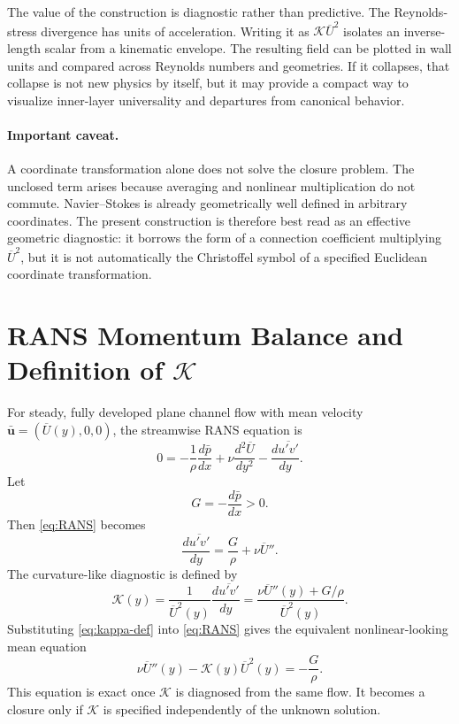 \documentclass[11pt]{article}
\newcommand{\Ut}{\overline{U}}
\newcommand{\uv}{\overline{u'v'}}
\newcommand{\kapg}{\mathcal{K}}
\begin{document}
The value of the construction is diagnostic rather than predictive. The Reynolds-stress divergence has units of acceleration. Writing it as $\kapg\Ut^2$ isolates an inverse-length scalar from a kinematic envelope. The resulting field can be plotted in wall units and compared across Reynolds numbers and geometries. If it collapses, that collapse is not new physics by itself, but it may provide a compact way to visualize inner-layer universality and departures from canonical behavior.

\paragraph{Important caveat.} A coordinate transformation alone does not solve the closure problem. The unclosed term arises because averaging and nonlinear multiplication do not commute. Navier--Stokes is already geometrically well defined in arbitrary coordinates. The present construction is therefore best read as an effective geometric diagnostic: it borrows the form of a connection coefficient multiplying $\Ut^2$, but it is not automatically the Christoffel symbol of a specified Euclidean coordinate transformation.

\section{RANS Momentum Balance and Definition of $\kapg$}

For steady, fully developed plane channel flow with mean velocity $\bar{\mathbf{u}}=(\Ut(y),0,0)$, the streamwise RANS equation is
\begin{equation}
0 = -\frac{1}{\rho}\frac{d\bar p}{dx}+\nu\frac{d^2\Ut}{dy^2}-\frac{d\uv}{dy}.
\label{eq:RANS}
\end{equation}
Let
\begin{equation}
G=-\frac{d\bar p}{dx}>0.
\end{equation}
Then \eqref{eq:RANS} becomes
\begin{equation}
\frac{d\uv}{dy}=\frac{G}{\rho}+\nu\Ut''.
\label{eq:uv-gradient}
\end{equation}
The curvature-like diagnostic is defined by
\begin{equation}
\boxed{\;\kapg(y)=\frac{1}{\Ut^2(y)}\frac{d\uv}{dy}
=\frac{\nu\Ut''(y)+G/\rho}{\Ut^2(y)}.\;}
\label{eq:kappa-def}
\end{equation}
Substituting \eqref{eq:kappa-def} into \eqref{eq:RANS} gives the equivalent nonlinear-looking mean equation
\begin{equation}
\nu\Ut''(y)-\kapg(y)\Ut^2(y)=-\frac{G}{\rho}.
\label{eq:diagnostic-ode}
\end{equation}
This equation is exact once $\kapg$ is diagnosed from the same flow. It becomes a closure only if $\kapg$ is specified independently of the unknown solution.
\end{document}
